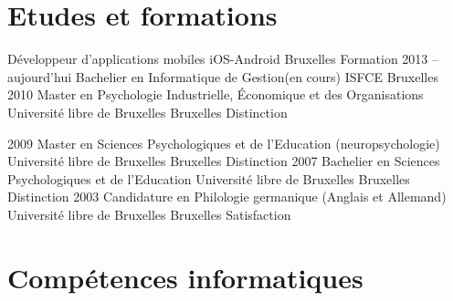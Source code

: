 \documentclass[11pt, a4paper]{moderncv}
\begin{document}
\section{Etudes et formations}
		{Développeur d’applications mobiles iOS-Android}
		{Bruxelles Formation}
		{}
		{}
		{}
	\cventry
		{2013 -- \linebreak aujourd'hui}
		{Bachelier en Informatique de Gestion(en cours)}
		{ISFCE}
		{Bruxelles}
		{}
		{}
	\cventry
		{2010}
		{Master en Psychologie Industrielle, Économique et des 
			Organisations}
		{Université libre de Bruxelles}
		{Bruxelles}
		{Distinction}
		{}

	\cventry
		{2009}
		{Master en Sciences Psychologiques et de l’Education 
			(neuropsychologie)}
		{Université libre de Bruxelles}
		{Bruxelles}
		{Distinction}
		{} 
	\cventry
		{2007}
		{Bachelier en Sciences Psychologiques et de l’Education}
		{Université libre de Bruxelles}
		{Bruxelles}
		{Distinction}
		{}
	\cventry
		{2003}
		{Candidature en Philologie germanique (Anglais et Allemand)}
		{Université libre de Bruxelles}
		{Bruxelles}
		{Satisfaction}
		{}

\section{Compétences informatiques}
			
\end{document}

